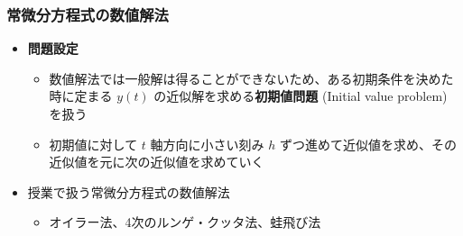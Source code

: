\documentclass[dvipdfmx,aspectratio=169,20pt]{beamer}
\newcommand{\myfontsetting}[3]{{\fontsize{#1}{#2}\selectfont #3}}
\begin{document}
\begin{frame}
\frametitle{\myfontsetting{28pt}{28pt}{常微分方程式の数値解法}}
\begin{itemize}
    \item \myfontsetting{15pt}{15pt}{\bf 問題設定}
    \begin{itemize}
        \setlength{\itemsep}{0.15cm}
        \item \myfontsetting{13pt}{13pt}{数値解法では一般解は得ることができないため、ある初期条件を決めた時に定まる $y(t)$ の近似解を求める{\bf 初期値問題} (Initial value problem) を扱う}
        \item \myfontsetting{13pt}{13pt}{初期値に対して $t$ 軸方向に小さい刻み $h$ ずつ進めて近似値を求め、その近似値を元に次の近似値を求めていく}
    \end{itemize}
    \item \myfontsetting{15pt}{15pt}{授業で扱う常微分方程式の数値解法}
    \begin{itemize}
        \setlength{\itemsep}{0.15cm}
        \item \myfontsetting{13pt}{13pt}{オイラー法、4次のルンゲ・クッタ法、蛙飛び法}
    \end{itemize}
\end{itemize}
\end{frame}
\end{document}

